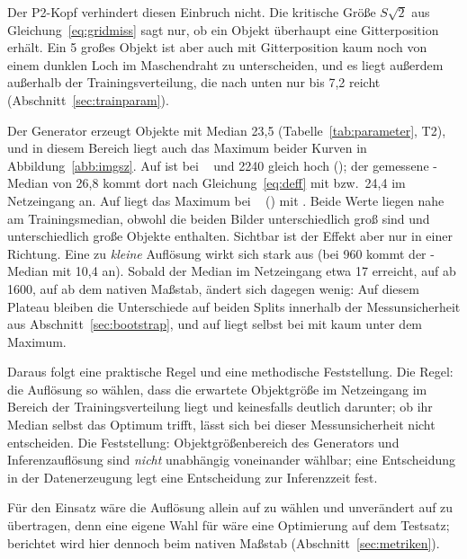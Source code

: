Der P2-Kopf verhindert diesen Einbruch nicht. Die kritische Größe $S\sqrt{2}$
aus Gleichung~\eqref{eq:gridmiss} sagt nur, ob ein Objekt überhaupt eine
Gitterposition erhält. Ein 5\px{} großes Objekt ist aber auch mit
Gitterposition kaum noch von einem dunklen Loch im Maschendraht zu
unterscheiden, und es liegt außerdem außerhalb der Trainingsverteilung, die nach
unten nur bis 7,2\px{} reicht (Abschnitt~\ref{sec:trainparam}).

 Der Generator erzeugt Objekte mit Median 23,5\px{}
(Tabelle~\ref{tab:parameter}, T2), und in diesem Bereich liegt auch das Maximum
beider Kurven in Abbildung~\ref{abb:imgsz}. Auf  ist \mAPfifty{} bei
~\zswValBestAt{} und 2240 gleich hoch (\zswValBest); der gemessene
-Median von 26,8\px{} kommt dort nach Gleichung~\eqref{eq:deff} mit
\zswValBestDeff{} bzw.\ 24,4\px{} im Netzeingang an. Auf  liegt das
Maximum bei ~\zswTestBestAt{} (\zswTestBest) mit \zswTestBestDeff\px.
Beide Werte liegen nahe am Trainingsmedian, obwohl die beiden Bilder
unterschiedlich groß sind und unterschiedlich große Objekte enthalten.
Sichtbar ist der Effekt aber nur in einer Richtung. Eine zu \emph{kleine}
Auflösung wirkt sich stark aus (bei 960 kommt der -Median mit
10,4\px{} an). Sobald der Median im Netzeingang etwa 17\px{} erreicht, auf
 ab 1600, auf  ab dem nativen Maßstab, ändert sich dagegen
wenig: Auf diesem Plateau bleiben die Unterschiede auf beiden Splits innerhalb
der Messunsicherheit aus Abschnitt~\ref{sec:bootstrap}, und auf 
liegt \mAPfifty{} selbst bei \zswTestHochAt{} mit \zswTestHoch{} kaum unter dem
Maximum.

Daraus folgt eine praktische Regel und eine methodische Feststellung. Die
Regel: die Auflösung so wählen, dass die erwartete Objektgröße im Netzeingang
im Bereich der Trainingsverteilung liegt und keinesfalls deutlich darunter; ob
ihr Median selbst das Optimum trifft, lässt sich bei dieser Messunsicherheit
nicht entscheiden. Die Feststellung: Objektgrößenbereich des Generators und
Inferenzauflösung sind \emph{nicht} unabhängig voneinander wählbar; eine
Entscheidung in der Datenerzeugung legt eine Entscheidung zur Inferenzzeit
fest.

Für den Einsatz wäre die Auflösung allein auf  zu wählen und
unverändert auf  zu übertragen, denn eine eigene Wahl für
 wäre eine Optimierung auf dem Testsatz; berichtet wird hier
dennoch beim nativen Maßstab (Abschnitt~\ref{sec:metriken}).

